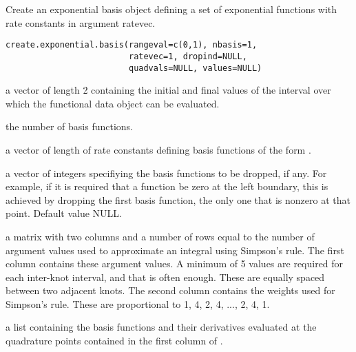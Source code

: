 \documentclass{article}
\begin{document}
\begin{Description}\relax
Create an exponential basis object defining a set of exponential
functions with rate constants in argument ratevec.
\end{Description}
\begin{Usage}
\begin{verbatim}
create.exponential.basis(rangeval=c(0,1), nbasis=1,
                         ratevec=1, dropind=NULL,
                         quadvals=NULL, values=NULL)
\end{verbatim}
\end{Usage}
\begin{Arguments}
\begin{ldescription}
\item[\code{rangeval}] a vector of length 2 containing the initial and final values of the
interval over which the functional data object can be evaluated.

\item[\code{nbasis}] the number of basis functions.

\item[\code{ratevec}] a vector of length  of rate constants
defining basis functions of the form .

\item[\code{dropind}] a vector of integers specifiying the basis functions to
be dropped, if any.  For example, if it is required that
a function be zero at the left boundary, this is achieved
by dropping the first basis function, the only one that
is nonzero at that point. Default value NULL.

\item[\code{quadvals}] a matrix with two columns and a number of rows equal to the number
of argument values used to approximate an integral using Simpson's
rule.  The first column contains these argument values.
A minimum of 5 values are required for
each inter-knot interval, and that is often enough. These
are equally spaced between two adjacent knots.
The second column contains the weights used for Simpson's
rule.  These are proportional to 1, 4, 2, 4, ..., 2, 4, 1.

\item[\code{values}] a list containing the basis functions and their derivatives
evaluated at the quadrature points contained in the first
column of .

\end{ldescription}
\end{Arguments}
\end{document}
